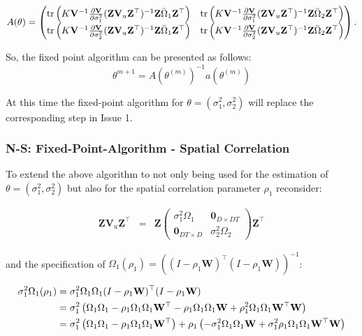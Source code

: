 \begin{align*}
A(\theta) = \left(\begin{matrix}
\operatorname{tr}\left(K\mathbf{V}^{-1}\frac{\partial\mathbf{V}}{\partial\sigma_1^2} (\mathbf{Z}\mathbf{V}_u\mathbf{Z}^\top)^{-1} \mathbf{Z}\bar{\Omega}_1\mathbf{Z}^\top \right) &
\operatorname{tr}\left(K\mathbf{V}^{-1}\frac{\partial\mathbf{V}}{\partial\sigma_1^2} (\mathbf{Z}\mathbf{V}_u\mathbf{Z}^\top)^{-1} \mathbf{Z}\bar{\Omega}_2\mathbf{Z}^\top \right) \\
\operatorname{tr}\left(K\mathbf{V}^{-1}\frac{\partial\mathbf{V}}{\partial\sigma_2^2} (\mathbf{Z}\mathbf{V}_u\mathbf{Z}^\top)^{-1} \mathbf{Z}\bar{\Omega}_1\mathbf{Z}^\top \right) &
\operatorname{tr}\left(K\mathbf{V}^{-1}\frac{\partial\mathbf{V}}{\partial\sigma_2^2} (\mathbf{Z}\mathbf{V}_u\mathbf{Z}^\top)^{-1} \mathbf{Z}\bar{\Omega}_2\mathbf{Z}^\top \right)
\end{matrix}\right) \text{.}
\end{align*}

So, the fixed point algorithm can be presented as follows: \[
\theta^{m+1} = A(\theta^{(m)})^{-1} a(\theta^{(m)})
\]

At this time the fixed-point algorithm for
$\theta = (\sigma_1^2, \sigma_2^2)$ will replace the corresponding step
in Issue 1.

\subsubsection{N-S: Fixed-Point-Algorithm - Spatial
Correlation}\label{n-s-fixed-point-algorithm---spatial-correlation}

To extend the above algorithm to not only being used for the estimation
of $\theta = (\sigma_1^2, \sigma_2^2)$ but also for the spatial
correlation parameter $\rho_1$ reconsider:

\begin{eqnarray}
\label{eq:zVuZ_rho1_1}
\mathbf{Z}\mathbf{V}_u\mathbf{Z}^\top &=& \mathbf{Z}\left(\begin{matrix}
\sigma_1^2\Omega_1 & \mathbf{0}_{D\times DT}\\
\mathbf{0}_{DT\times D} &  \sigma_2^2\Omega_2
\end{matrix}\right)\mathbf{Z}^\top
\end{eqnarray}

and the specification of
$\Omega_1(\rho_1) = \left((I-\rho_1\mathbf{W})^\top(I-\rho_1\mathbf{W})\right)^{-1}$:

\begin{align}
\sigma_1^2\Omega_1(\rho_1) &= \sigma_1^2\Omega_1\Omega_1(I-\rho_1\mathbf{W})^\top(I-\rho_1\mathbf{W}) \notag\\
&= \sigma_1^2\left(\Omega_1\Omega_1 -\rho_1\Omega_1\Omega_1\mathbf{W}^\top -\rho_1\Omega_1\Omega_1\mathbf{W} + \rho_1^2\Omega_1\Omega_1\mathbf{W}^\top\mathbf{W}\right) \notag\\
&= \sigma_1^2\left(\Omega_1\Omega_1 -\rho_1\Omega_1\Omega_1\mathbf{W}^\top\right) +\rho_1 \left(-\sigma_1^2\Omega_1\Omega_1\mathbf{W} + \sigma_1^2\rho_1\Omega_1\Omega_1\mathbf{W}^\top\mathbf{W}\right) \label{eq:zVuZ_rho1_2}
\end{align}

